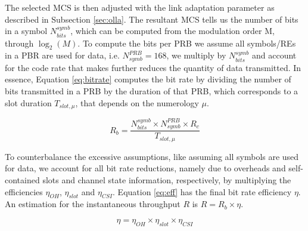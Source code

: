 The selected MCS is then adjusted with the link adaptation parameter as described in Subsection \ref{sec:olla}. The resultant MCS tells us the number of bits in a symbol $N_{bits}^{symb}$, which can be computed from the modulation order M, through $\log_2(M)$. To compute the bits per PRB we assume all symbols/REs in a PBR are used for data, i.e. $N_{symb}^{PRB} = 168$, we multiply by $N_{bits}^{symb}$ and account for the code rate that makes further reduces the quantity of data transmitted. In essence, Equation \eqref{eq:bitrate} computes the bit rate by dividing the number of bits transmitted in a PRB by the duration of that PRB, which corresponds to a slot duration $T_{slot, \mu}$, that depends on the numerology $\mu$.

\begin{equation} \label{eq:bitrate}
    R_b = \frac{N_{bits}^{symb} \times N_{symb}^{PRB} \times R_{c}}{T_{slot, \mu}} 
\end{equation}

To counterbalance the excessive assumptions, like assuming all symbols are used for data, we account for all bit rate reductions, namely due to overheads and self-contained slots and channel state information, respectively, by multiplying the efficiencies $\eta_{OH}$, $\eta_{slot}$ and $\eta_{CSI}$. Equation \eqref{eq:eff} has the final bit rate efficiency $\eta$. An estimation for the instantaneous throughput $R$ is $R = R_b \times \eta$.


\begin{equation} \label{eq:eff}
    \eta = \eta_{OH} \times \eta_{slot} \times \eta_{CSI}
\end{equation}




